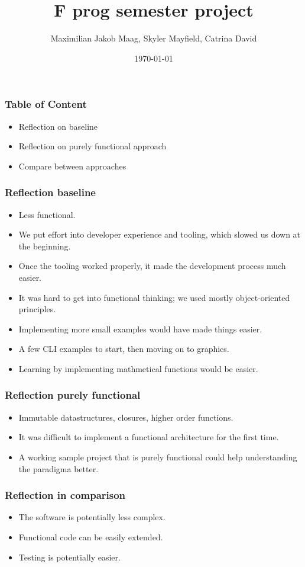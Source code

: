 \documentclass{beamer}
\title{F prog semester project}
\author{Maximilian Jakob Maag, Skyler Mayfield, Catrina David}
\date{\today}
\begin{document}
	\begin{frame}
		\titlepage
	\end{frame}
	\begin{frame}
		\frametitle{Table of Content}
		\begin{itemize}
			\item Reflection on baseline
			\item Reflection on purely functional approach
			\item Compare between approaches
		\end{itemize}
	\end{frame}
	\begin{frame}
		\frametitle{Reflection baseline}
		\begin{itemize}
            \item Less functional.
            \item We put effort into developer experience and tooling, which slowed us down at the beginning.
            \item Once the tooling worked properly, it made the development process much easier.
            \item It was hard to get into functional thinking; we used mostly object-oriented principles.
            \item Implementing more small examples would have made things easier.
			\item A few CLI examples to start, then moving on to graphics.
            \item Learning by implementing mathmetical functions would be easier.
		\end{itemize}
	\end{frame}
	\begin{frame}
		\frametitle{Reflection purely functional}
		\begin{itemize}
			\item Immutable datastructures, closures, higher order functions.
			\item It was difficult to implement a functional architecture for the first time.
			\item A working sample project that is purely functional could help understanding the paradigma better.
		\end{itemize}
	\end{frame}
	\begin{frame}
		\frametitle{Reflection in comparison}
		\begin{itemize}
			\item The software is potentially less complex.
			\item Functional code can be easily extended.
			\item Testing is potentially easier.
		\end{itemize}
	\end{frame}
\end{document}
